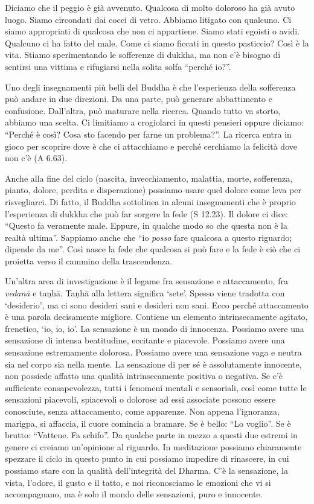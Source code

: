 Diciamo che il peggio è già avvenuto. Qualcosa di molto doloroso ha già avuto luogo. Siamo circondati dai cocci di vetro. Abbiamo litigato con qualcuno. Ci siamo appropriati di qualcosa che non ci appartiene. Siamo stati egoisti o avidi. Qualcuno ci ha fatto del male. Come ci siamo ficcati in questo pasticcio? Così è la vita. Stiamo sperimentando le sofferenze di dukkha, ma non c'è bisogno di sentirsi una vittima e rifugiarsi nella solita solfa ``perché io?''.

Uno degli insegnamenti più belli del Buddha è che l'esperienza della sofferenza può andare in due direzioni. Da una parte, può generare abbattimento e confusione. Dall'altra, può maturare nella ricerca. Quando tutto va storto, abbiamo una scelta. Ci limitiamo a crogiolarci in questi pensieri oppure diciamo: ``Perché è così? Cosa sto facendo per farne un problema?''. La ricerca entra in gioco per scoprire dove è che ci attacchiamo e perché cerchiamo la felicità dove non c'è (A 6.63).

Anche alla fine del ciclo (nascita, invecchiamento, malattia, morte, sofferenza, pianto, dolore, perdita e disperazione) possiamo usare quel dolore come leva per risvegliarci. Di fatto, il Buddha sottolinea in alcuni insegnamenti che è proprio l'esperienza di dukkha che può far sorgere la fede (S 12.23). Il dolore ci dice: ``Questo fa veramente male. Eppure, in qualche modo so che questa non è la realtà ultima''. Sappiamo anche che ``io \textit{posso }fare qualcosa a questo riguardo; dipende da me''. Così nasce la fede che qualcosa si può fare e la fede è ciò che ci proietta verso il cammino della trascendenza.

Un'altra area di investigazione è il legame fra sensazione e attaccamento, fra \textit{vedanā} e taṇhā. Taṇhā alla lettera significa `sete'. Spesso viene tradotta con `desiderio', ma ci sono desideri sani e desideri non sani. Ecco perché attaccamento è una parola decisamente migliore. Contiene un elemento intrinsecamente agitato, frenetico, `io, io, io'. La sensazione è un mondo di innocenza. Possiamo avere una sensazione di intensa beatitudine, eccitante e piacevole. Possiamo avere una sensazione estremamente dolorosa. Possiamo avere una sensazione vaga e neutra sia nel corpo sia nella mente. La sensazione di per sé è assolutamente innocente, non possiede affatto una qualità intrinsecamente positiva o negativa. Se c'è sufficiente consapevolezza, tutti i fenomeni mentali e sensoriali, così come tutte le sensazioni piacevoli, spiacevoli o dolorose ad essi associate possono essere conosciute, senza attaccamento, come apparenze. Non appena l'ignoranza, marigpa, si affaccia, il cuore comincia a bramare. Se è bello: ``Lo voglio''. Se è brutto: ``Vattene. Fa schifo''. Da qualche parte in mezzo a questi due estremi in genere ci creiamo un'opinione al riguardo. In meditazione possiamo chiaramente spezzare il ciclo in questo punto in cui possiamo impedire di rinascere, in cui possiamo stare con la qualità dell'integrità del Dharma. C'è la sensazione, la vista, l'odore, il gusto e il tatto, e noi riconosciamo le emozioni che vi si accompagnano, ma è solo il mondo delle sensazioni, puro e innocente.

